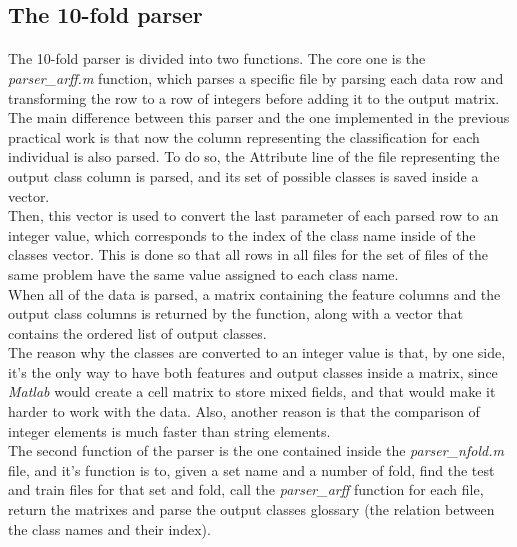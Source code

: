 \documentclass[12pt, a4paper]{article}
\begin{document}
\subsection{The 10-fold parser} %
\label{sub:the_10_fold_parser}
\paragraph{}The 10-fold parser is divided into two functions. The core one is the \emph{parser\_arff.m} function, which parses a specific file by parsing each data row and transforming the row to a row of integers before adding it to the output matrix.\\

The main difference between this parser and the one implemented in the previous practical work is that now the column representing the classification for each individual is also parsed. To do so, the Attribute line of the file representing the output class column is parsed, and its set of possible classes is saved inside a vector.\\

Then, this vector is used to convert the last parameter of each parsed row to an integer value, which corresponds to the index of the class name inside of the classes vector. This is done so that all rows in all files for the set of files of the same problem have the same value assigned to each class name.\\

When all of the data is parsed, a matrix containing the feature columns and the output class columns is returned by the function, along with a vector that contains the ordered list of output classes.\\

The reason why the classes are converted to an integer value is that, by one side, it's the only way to have both features and output classes inside a matrix, since \emph{Matlab} would create a cell matrix to store mixed fields, and that would make it harder to work with the data. Also, another reason is that the comparison of integer elements is much faster than string elements.\\

The second function of the parser is the one contained inside the \emph{parser\_nfold.m} file, and it's function is to, given a set name and a number of fold, find the test and train files for that set and fold, call the \emph{parser\_arff} function for each file, return the matrixes and parse the output classes glossary (the relation between the class names and their index).
\end{document}
